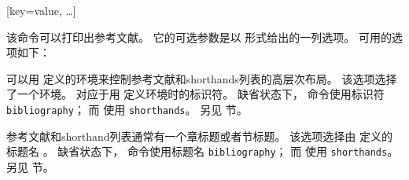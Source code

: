 \begin{ltxsyntax}

[key=value, \dots]


该命令可以打印出参考文献。
它的可选参数是以 \keyval 形式给出的一列选项。
可用的选项如下：

\end{ltxsyntax}

\begin{optionlist*}



可以用  定义的环境来控制参考文献和shorthands列表的高层次布局。
该选项选择了一个环境。
 对应于用  定义环境时的标识符。
缺省状态下， 命令使用标识符 \texttt{bibliography}；
而  使用 \texttt{shorthands}。
另见  节。




参考文献和shorthand列表通常有一个章标题或者节标题。
该选项选择由  定义的标题名 。
缺省状态下， 命令使用标题名 \texttt{bibliography}；
而  使用 \texttt{shorthands}。
另见  节。




\end{optionlist*}
